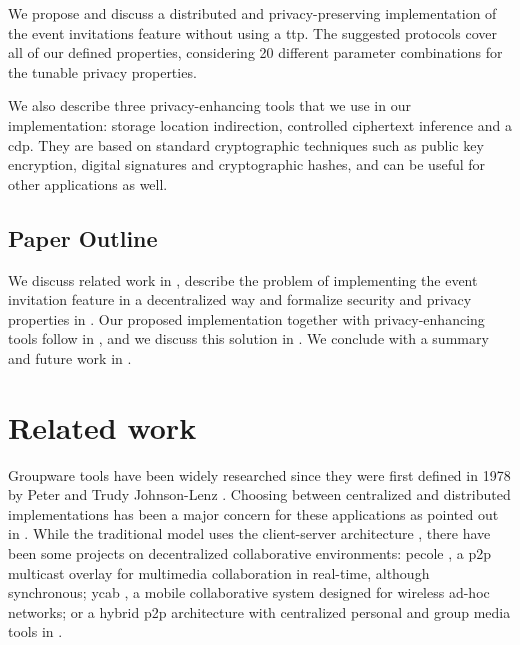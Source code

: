 We propose and discuss a distributed and privacy-preserving implementation
of the event invitations feature without using a \Ac{ttp}. The
suggested protocols cover all of our defined properties, considering 20
different parameter combinations for the tunable privacy properties.

We also describe three privacy-enhancing tools that we use in our
implementation: storage location indirection, controlled ciphertext
inference and a \acl*{cdp}.
They are based on
standard cryptographic techniques such 
as public key encryption, digital signatures and cryptographic hashes,
and can be useful for other applications 
as well.

\subsection{Paper Outline}
	\label{subsection:event-invitations-dosns:paper-outline}
We discuss related work in , describe the problem of implementing the event invitation 
feature in a decentralized way and formalize security and privacy properties in . 
Our proposed implementation together with privacy-enhancing tools follow in , and we discuss 
this solution in . 
We conclude with a summary and future work in .

\section{Related work}
	\label{section:event-invitations-dosns:related-work}
Groupware tools have been widely researched since they were first defined in 1978 
by Peter and Trudy Johnson-Lenz \cite{JohnsonLenz98}. 
%
Choosing between centralized and distributed implementations has been a major concern 
for these applications as pointed out in \cite{ReinhardSVW94}. While the traditional
model uses the client-server architecture \cite{TrevorKW97,LiOFWLN04}, there have 
been some projects on decentralized collaborative environments: \Acl{pecole} \cite{El-SaddikRAS08}, 
a \acs*{p2p} multicast overlay for multimedia collaboration in real-time, although 
synchronous; \acs*{ycab} \cite{BuszkoLH01}, a mobile collaborative system designed 
for wireless ad-hoc networks; or a hybrid \acs*{p2p} architecture with centralized 
personal and group media tools in \cite{ZhangJ06}.

